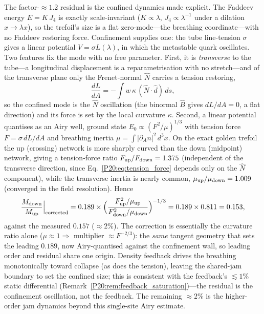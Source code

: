 \begin{remark}
\label{P20:rem:isospin_breathing}
The factor-$\approx1.2$ residual is the confined dynamics made explicit. The
Faddeev energy $E=K\,J_4$ is exactly scale-invariant ($K\propto\lambda$,
$J_4\propto\lambda^{-1}$ under a dilation $x\to\lambda x$), so the trefoil's
size is a flat zero-mode---the breathing coordinate---with no Faddeev
restoring force. Confinement supplies one: the tube line-tension $\sigma$
gives a linear potential $V=\sigma L(\lambda)$, in which the metastable quark
oscillates. Two features fix the mode with no free parameter. First, it is
\emph{transverse} to the tube---a longitudinal displacement is a
reparametrisation with no stretch---and of the transverse plane only the
Frenet-normal $\hat N$ carries a tension restoring,
\begin{equation}
  \frac{dL}{dA}=-\!\int w\,\kappa\,(\hat N\!\cdot\!\hat d)\,ds ,
  \label{P20:eq:tension_force}
\end{equation}
so the confined mode is the $\hat N$ oscillation (the binormal $\hat B$ gives
$dL/dA=0$, a flat direction) and its force is set by the local curvature
$\kappa$. Second, a linear potential quantises as an Airy well, ground state
$E_0\propto(F^2/\mu)^{1/3}$ with tension force $F=\sigma\,dL/dA$ and breathing
inertia $\mu=\int|\partial_A n|^2\,d^3x$. On the exact golden trefoil the up
(crossing) network is more sharply curved than the down (midpoint) network,
giving a tension-force ratio $F_{\rm up}/F_{\rm down}=1.375$ (independent of
the transverse direction, since Eq.~\eqref{P20:eq:tension_force} depends only
on the $\hat N$ component), while the transverse inertia is nearly common,
$\mu_{\rm up}/\mu_{\rm down}=1.009$ (converged in the field resolution). Hence
\begin{equation}
  \frac{M_{\mathrm{down}}}{M_{\mathrm{up}}}\Big|_{\rm corrected}
   =0.189\times\Bigl(\frac{F_{\rm up}^2/\mu_{\rm up}}
                          {F_{\rm down}^2/\mu_{\rm down}}\Bigr)^{-1/3}
   =0.189\times0.811=0.153 ,
\end{equation}
against the measured $0.157$ ($\approx2\%$). The correction is essentially the
curvature ratio alone ($\mu\!\approx\!1\Rightarrow$ multiplier
$\approx F^{-2/3}$): the \emph{same} tangent geometry that sets the leading
$0.189$, now Airy-quantised against the confinement wall, so leading order and
residual share one origin. Density feedback drives the breathing monotonically
toward collapse (as does the tension), leaving the shared-jam boundary to set
the confined size; this is consistent with the feedback's $\lesssim1\%$ static
differential (Remark~\ref{P20:rem:feedback_saturation})---the residual is the
confinement oscillation, not the feedback. The remaining $\approx2\%$ is the
higher-order jam dynamics beyond this single-site Airy estimate.
\end{remark}


